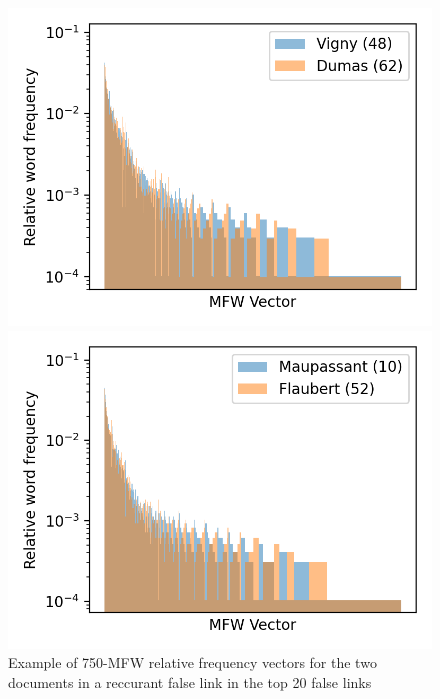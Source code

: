 \begin{figure}
  \centering
  \caption{Example of 750-MFW relative frequency vectors for the two documents in a reccurant false link in the top 20 false links}
  \label{fig:mfw_vector_error}

  \label{fig:mfw_vector_error_0}
  \includegraphics[width=\linewidth]{img/mfw_vector_error_0.png}

  \vspace{0.5cm}

  \label{fig:mfw_vector_error_1}
  \includegraphics[width=\linewidth]{img/mfw_vector_error_1.png}
\end{figure}

